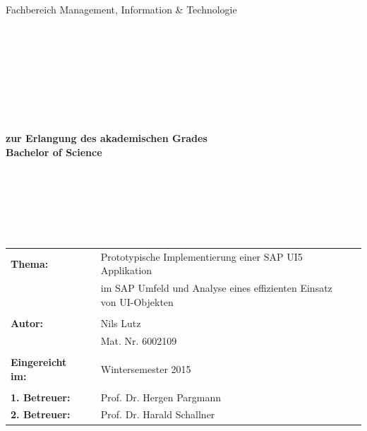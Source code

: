 \begin{center}
\Large{Fachbereich Management, Information \& Technologie}
\end{center}
\begin{verbatim}




\end{verbatim}
\begin{center}
\doublespacing
\textbf{\LARGE{\titleDocument}}\\
\singlespacing
\begin{verbatim}

\end{verbatim}
\end{center}
\begin{verbatim}

\end{verbatim}
\begin{center}

\end{center}
\begin{verbatim}

\end{verbatim}
\begin{center}
\textbf{zur Erlangung des akademischen Grades \\ Bachelor of Science}
\end{center}
\begin{verbatim}






\end{verbatim}
\begin{flushleft}
\begin{tabular}{llll}
\textbf{Thema:} & & Prototypische Implementierung einer SAP UI5 Applikation & \\
& & im SAP Umfeld und Analyse eines effizienten Einsatz von UI-Objekten & \\
& & \\
\textbf{Autor:} & & Nils Lutz& \\
& & Mat. Nr. 6002109 & \\
& & \\
\textbf{Eingereicht im:} & & Wintersemester 2015 &\\
& & \\
\textbf{1. Betreuer:} & & Prof. Dr. Hergen Pargmann &\\
\textbf{2. Betreuer:} & & Prof. Dr. Harald Schallner &\\
\end{tabular}
\end{flushleft}